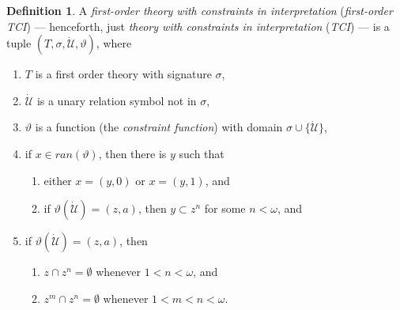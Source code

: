 \documentclass[12pt, twoside]{memoir}
\numberwithin{equation}{section}
\theoremstyle{definition}
\newtheorem{defi}[thm]{Definition}
\theoremstyle{remark}
\theoremstyle{definition}
\theoremstyle{definition}
\theoremstyle{definition}
\theoremstyle{remark}
\begin{document}
\begin{defi}\label{TCIdef}
A \emph{first-order theory with constraints in interpretation} (\emph{first-order TCI}) --- henceforth, just \emph{theory with constraints in interpretation} (\emph{TCI}) --- is a tuple $(T, \sigma, \dot{\mathcal{U}}, \vartheta)$, where
\begin{enumerate}[label=(\alph*)]
    \item $T$ is a first order theory with signature $\sigma$,
    \item $\dot{\mathcal{U}}$ is a unary relation symbol not in $\sigma$,
    \item $\vartheta$ is a function (the \emph{constraint function}) with domain $\sigma \cup \{\dot{\mathcal{U}}\}$, 
    \item if $x \in ran(\vartheta)$, then there is $y$ such that 
    \begin{enumerate}[label=(\roman*)]
        \item either $x = (y, 0)$ or $x = (y, 1)$, and
        \item if $\vartheta(\dot{\mathcal{U}}) = (z, a)$, then $y \subset z^n$ for some $n < \omega$, and
    \end{enumerate}
    \item if $\vartheta(\dot{\mathcal{U}}) = (z, a)$, then 
    \begin{enumerate}[label=(\roman*)]
        \item $z \cap z^n = \emptyset$ whenever $1 < n < \omega$, and
        \item $z^m \cap z^n = \emptyset$ whenever $1 < m < n < \omega$.
    \end{enumerate}
\end{enumerate}
\end{defi}
\end{document}

